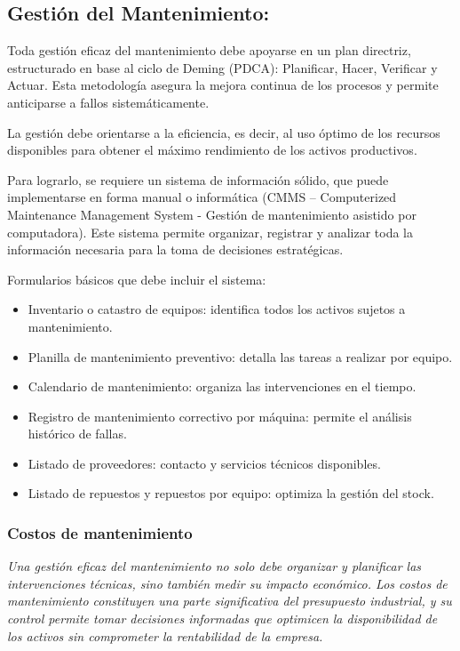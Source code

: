 \documentclass[a4paper,oneside,11pt]{article}
\begin{document}
\subsection{Gestión del Mantenimiento:}

Toda gestión eficaz del mantenimiento debe apoyarse en un plan directriz, estructurado en base al ciclo de Deming (PDCA): Planificar, Hacer, Verificar y Actuar. Esta metodología asegura la mejora continua de los procesos y permite anticiparse a fallos sistemáticamente.

La gestión debe orientarse a la eficiencia, es decir, al uso óptimo de los recursos disponibles para obtener el máximo rendimiento de los activos productivos.

Para lograrlo, se requiere un sistema de información sólido, que puede implementarse en forma manual o informática (CMMS – Computerized Maintenance Management System - Gestión de mantenimiento asistido por computadora). Este sistema permite organizar, registrar y analizar toda la información necesaria para la toma de decisiones estratégicas.

Formularios básicos que debe incluir el sistema:
\begin{itemize}
    \item Inventario o catastro de equipos: identifica todos los activos sujetos a mantenimiento.
    \item Planilla de mantenimiento preventivo: detalla las tareas a realizar por equipo.
    \item Calendario de mantenimiento: organiza las intervenciones en el tiempo.
    \item Registro de mantenimiento correctivo por máquina: permite el análisis histórico de fallas.
    \item Listado de proveedores: contacto y servicios técnicos disponibles.
    \item Listado de repuestos y repuestos por equipo: optimiza la gestión del stock.
\end{itemize}

\subsubsection{Costos de mantenimiento}

\textit{Una gestión eficaz del mantenimiento no solo debe organizar y planificar las intervenciones técnicas, sino también medir su impacto económico.
Los costos de mantenimiento constituyen una parte significativa del presupuesto industrial, y su control permite tomar decisiones informadas que optimicen la disponibilidad de los activos sin comprometer la rentabilidad de la empresa.}
\end{document}
